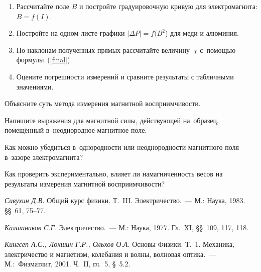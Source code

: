 \begin{lab:task}
\begin{enumerate}
\end{enumerate}


\begin{enumerate}
	\item Рассчитайте поле $B$ и постройте градуировочную кривую для электромагнита: $B=f(I)$.
	\item Постройте на одном листе графики $|\Delta P|=f(B^2$) для меди и алюминия.
	\item По наклонам полученных прямых рассчитайте величину~$\chi$ с~помощью формулы~(\eqref{final}).
	\item Оцените погрешности измерений и сравните результаты с табличными значениями.
\end{enumerate}

\end{lab:task}


\begin{lab:questions}
	\item Объясните суть метода измерения магнитной восприимчивости.
	\item Напишите выражения для магнитной силы, действующей на~образец, помещённый в~неоднородное магнитное поле.
	\item Как можно убедиться в~однородности или неоднородности магнитного поля в~зазоре электромагнита?
	\item Как проверить экспериментально, влияет ли намагниченность весов на результаты измерения магнитной восприимчивости?
\end{lab:questions}


\begin{lab:literature}
	\item \emph{Сивухин Д.В.} Общий курс физики. Т.~III. Электричество.~--- М.: Наука, 1983. \S\S~61, 75--77.
	\item \emph {Калашников С.Г.} Электричество.~--- М.: Наука, 1977. Гл.~ХI, \S\S~109, 117, 118.
	\item \emph{Кингсеп А.С., Локшин Г.Р., Ольхов О.А.} Основы Физики. Т.~1. Механика, электричество и магнетизм, колебания и волны, волновая оптика.~--- М.:~Физматлит, 2001. Ч.~II, гл.~5, \S~5.2.
\end{lab:literature}

